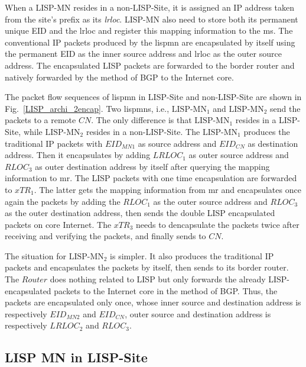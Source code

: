 When a LISP-MN resides in a non-LISP-Site, it is assigned an IP address taken from the site's prefix as its \emph{\acrshort{lrloc}}. LISP-MN also need to store both its permanent unique EID and the \acrshort{lrloc} and register this mapping information to the \acrshort{ms}. The conventional IP packets produced by the \acrshort{lispmn} are encapsulated by itself using the permanent EID as the inner source address and \acrshort{lrloc} as the outer source address. The encapsulated LISP packets are forwarded to the border router and natively forwarded by the method of BGP to the Internet core. 

The packet flow sequences of \acrshort{lispmn} in LISP-Site and non-LISP-Site are shown in Fig.~\ref{LISP_archi_2encap}. Two \acrshort{lispmn}s, i.e., $\text{LISP-MN}_1$ and $\text{LISP-MN}_2$ send the packets to a remote $CN$. The only difference is that $\text{LISP-MN}_1$ resides in a LISP-Site, while $\text{LISP-MN}_2$ resides in a non-LISP-Site. The $\text{LISP-MN}_1$ produces the traditional IP packets with $EID_{MN1}$ as source address and $EID_{CN}$ as destination address. Then it encapsulates by adding $LRLOC_1$ as outer source address and $RLOC_3$ as outer destination address by itself after querying the mapping information to \acrshort{mr}. The LISP packets with one time encapsulation are forwarded to $xTR_1$. The latter gets the mapping information from \acrshort{mr} and encapsulates once again the packets by adding the $RLOC_1$ as the outer source address and $RLOC_3$ as the outer destination address, then sends the double LISP encapsulated packets on core Internet. The $xTR_3$ needs to dencapsulate the packets twice after receiving and verifying the packets, and finally sends to $CN$.

The situation for $\text{LISP-MN}_2$ is simpler. It also produces the traditional IP packets and encapsulates the packets by itself, then sends to its border router. The $Router$ does nothing related to LISP but only forwards the already LISP-encapsulated packets to the Internet core in the method of BGP. Thus, the packets are encapsulated only once, whose inner source and destination address is respectively $EID_{MN2}$ and $EID_{CN}$, outer source and destination address is respectively $LRLOC_2$ and $RLOC_3$.


\subsection{LISP MN in LISP-Site}
\label{subsec:lispMN_LS}

